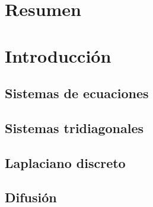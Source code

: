\documentclass[10pt,a4paper]{article}
\begin{document}


\maketitle

\newpage

\tableofcontents

\newpage

\section{Resumen} \label{sec:Resumen} 

\section{Introducción} \label{sec:Intro}

\subsection{Sistemas de ecuaciones} \label{intro_sistemas_ecuaciones}


\subsection{Sistemas tridiagonales} \label{intro_sistemas_tridiagonales}


\subsection{Laplaciano discreto} \label{intro_laplaciano_discreto}


\subsection{Difusión} \label{intro_difusion}

\end{document}

